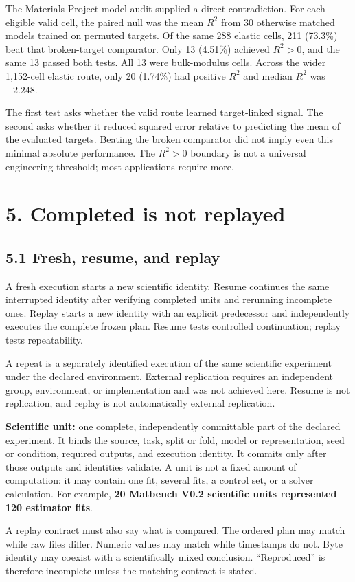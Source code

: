 \documentclass[10pt,a4paper]{article}
\begin{document}
The Materials Project model audit supplied a direct contradiction. For each eligible valid cell, the paired null was the mean $R^2$ from 30 otherwise matched models trained on permuted targets. Of the same 288 elastic cells, 211 (73.3\%) beat that broken-target comparator. Only 13 (4.51\%) achieved $R^2>0$, and the same 13 passed both tests. All 13 were bulk-modulus cells. Across the wider 1,152-cell elastic route, only 20 (1.74\%) had positive $R^2$ and median $R^2$ was $-2.248$.

The first test asks whether the valid route learned target-linked signal. The second asks whether it reduced squared error relative to predicting the mean of the evaluated targets. Beating the broken comparator did not imply even this minimal absolute performance. The $R^2>0$ boundary is not a universal engineering threshold; most applications require more.

\section{5. Completed is not replayed}
\subsection{5.1 Fresh, resume, and replay}
A fresh execution starts a new scientific identity. Resume continues the same interrupted identity after verifying completed units and rerunning incomplete ones. Replay starts a new identity with an explicit predecessor and independently executes the complete frozen plan. Resume tests controlled continuation; replay tests repeatability.

A repeat is a separately identified execution of the same scientific experiment under the declared environment. External replication requires an independent group, environment, or implementation and was not achieved here. Resume is not replication, and replay is not automatically external replication.

\textbf{Scientific unit:} one complete, independently committable part of the declared experiment. It binds the source, task, split or fold, model or representation, seed or condition, required outputs, and execution identity. It commits only after those outputs and identities validate. A unit is not a fixed amount of computation: it may contain one fit, several fits, a control set, or a solver calculation. For example, \textbf{20 Matbench V0.2 scientific units represented 120 estimator fits}.

A replay contract must also say what is compared. The ordered plan may match while raw files differ. Numeric values may match while timestamps do not. Byte identity may coexist with a scientifically mixed conclusion. ``Reproduced'' is therefore incomplete unless the matching contract is stated.
\end{document}
